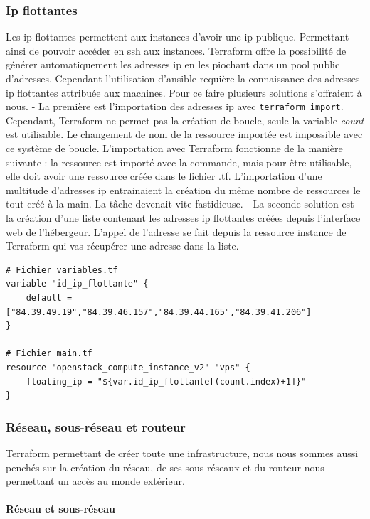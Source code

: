 \documentclass[]{article}
\let\oldparagraph\paragraph
\renewcommand{\paragraph}[1]{\oldparagraph{#1}\mbox{}}
\begin{document}
\subsubsection{Ip flottantes}\label{ip-flottantes}

Les ip flottantes permettent aux instances d'avoir une ip publique.
Permettant ainsi de pouvoir accéder en ssh aux instances. Terraform
offre la possibilité de générer automatiquement les adresses ip en les
piochant dans un pool public d'adresses. Cependant l'utilisation
d'ansible requière la connaissance des adresses ip flottantes attribuée
aux machines. Pour ce faire plusieurs solutions s'offraient à nous. - La
première est l'importation des adresses ip avec
\texttt{terraform\ import}. Cependant, Terraform ne permet pas la
création de boucle, seule la variable \emph{count} est utilisable. Le
changement de nom de la ressource importée est impossible avec ce
système de boucle. L'importation avec Terraform fonctionne de la manière
suivante : la ressource est importé avec la commande, mais pour être
utilisable, elle doit avoir une ressource créée dans le fichier .tf.
L'importation d'une multitude d'adresses ip entrainaient la création du
même nombre de ressources le tout créé à la main. La tâche devenait vite
fastidieuse. - La seconde solution est la création d'une liste contenant
les adresses ip flottantes créées depuis l'interface web de l'hébergeur.
L'appel de l'adresse se fait depuis la ressource instance de Terraform
qui vas récupérer une adresse dans la liste.

\begin{verbatim}
# Fichier variables.tf
variable "id_ip_flottante" {
    default = ["84.39.49.19","84.39.46.157","84.39.44.165","84.39.41.206"]
}

# Fichier main.tf
resource "openstack_compute_instance_v2" "vps" {
	floating_ip = "${var.id_ip_flottante[(count.index)+1]}"
}
\end{verbatim}

\subsubsection{Réseau, sous-réseau et
routeur}\label{ruxe9seau-sous-ruxe9seau-et-routeur}

Terraform permettant de créer toute une infrastructure, nous nous sommes
aussi penchés sur la création du réseau, de ses sous-réseaux et du
routeur nous permettant un accès au monde extérieur.

\paragraph{Réseau et sous-réseau}\label{ruxe9seau-et-sous-ruxe9seau}
\end{document}
